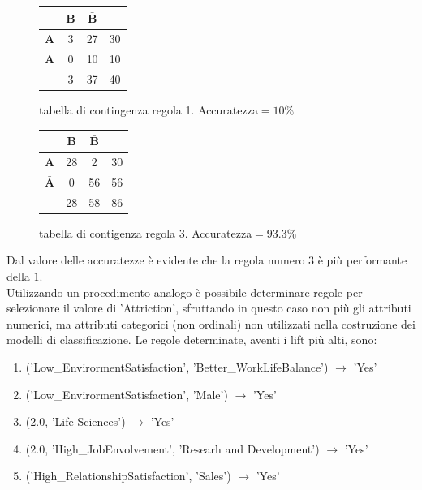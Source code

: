 \documentclass[a4paper,9pt]{article}
\begin{document}
\begin{figure}[H]
  \centering
  \begin{minipage}{.45\textwidth}
    \centering
    \begin{tabular}{l|cc|r}
& \bfseries B & $\bar{\textbf {B}}$ &\\
\hline
\bfseries A & 3 & 27 &30\\
 $\bar{\textbf {A}}$ & 0&10&10\\
\hline
& 3&37&40\\
\end{tabular}
    \caption{tabella di contingenza regola 1. Accuratezza$=10\%$}
  \end{minipage}
  \begin{minipage}{.45\textwidth}
    \centering
    \begin{tabular}{l|cc|r}
& \bfseries B &  $\bar{\textbf {B}}$ &\\
\hline
\bfseries A & 28& 2 &30\\
 $\bar{\textbf {A}}$ & 0&56&56\\
\hline
& 28&58&86\\
\end{tabular}
    \caption{tabella di contigenza regola 3.  Accuratezza$=93.3\%$}
  \end{minipage}
  \end{figure}

Dal valore delle accuratezze è evidente che la regola numero $3$ è più performante della $1$.\\

Utilizzando un procedimento analogo è possibile determinare regole per selezionare il valore di 'Attriction', sfruttando in questo caso non più gli attributi numerici, ma attributi categorici (non ordinali) non utilizzati nella costruzione dei modelli di classificazione.
Le regole determinate, aventi i lift più alti, sono:

\begin{enumerate}
\item ('Low\_EnvirormentSatisfaction', 'Better\_WorkLifeBalance') $\longrightarrow$ 'Yes'
\item ('Low\_EnvirormentSatisfaction', 'Male') $\longrightarrow$ 'Yes'
\item ($2.0$, 'Life Sciences') $\longrightarrow$ 'Yes'
\item ($2.0$, 'High\_JobEnvolvement', 'Researh and Development') $\longrightarrow$ 'Yes'
\item ('High\_RelationshipSatisfaction', 'Sales') $\longrightarrow$ 'Yes'
\end{enumerate}
\end{document}
